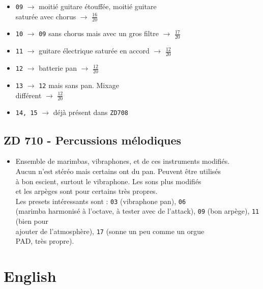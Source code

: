 \documentclass[a4paper, 13pt]{article}
\begin{document}
\begin{itemize}
    \item \texttt{09} $\rightarrow$ moitié guitare étouffée, moitié guitare \\ saturée avec chorus $\rightarrow$ \Large{$\frac{16}{20}$} \normalsize \vspace{0.2cm}
    \item \texttt{10} $\rightarrow$ \texttt{09} sans chorus mais avec un gros filtre $\rightarrow$ \Large{$\frac{17}{20}$} \normalsize \vspace{0.2cm}
    \item \texttt{11} $\rightarrow$ guitare électrique saturée en accord $\rightarrow$ \Large{$\frac{12}{20}$} \normalsize \vspace{0.2cm}
    \item \texttt{12} $\rightarrow$ batterie pan $\rightarrow$ \Large{$\frac{12}{20}$} \normalsize \vspace{0.2cm}
    \item \texttt{13} $\rightarrow$ \texttt{12} mais sans pan. Mixage \\ différent $\rightarrow$ \Large{$\frac{12}{20}$} \normalsize \vspace{0.2cm}
    \item \texttt{14, 15} $\rightarrow$ déjà présent dans \texttt{ZD708}
\end{itemize}


\vspace{1cm}
\subsection*{ZD 710 - Percussions mélodiques}
\begin{itemize}
    \item Ensemble de marimbas, vibraphones, et de ces instruments modifiés. \\ Aucun n'est stéréo mais certains ont du pan. Peuvent être utilisés \\
          à bon escient, surtout le vibraphone. Les sons plus modifiés \\ et les arpèges sont pour certains très propres. \\
          Les presets intéressants sont : \texttt{03} (vibraphone pan), \texttt{06} \\(marimba harmonisé à l'octave, à tester avec de l'attack),
          \texttt{09} (bon arpège), \texttt{11} (bien pour \\ajouter de l'atmosphère), \texttt{17} (sonne un peu comme un orgue \\ PAD, très propre).
\end{itemize}



\vspace{1cm}
\section*{English}
\end{document}
